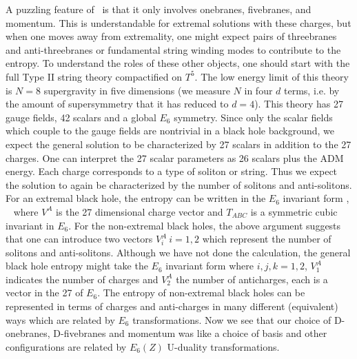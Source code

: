 A puzzling feature of \smira\ is that it only involves onebranes,
fivebranes, and momentum. This is understandable for extremal solutions
with these charges, but when one moves away from extremality, one might
expect pairs of threebranes and anti-threebranes or fundamental string
winding modes to contribute to the entropy. To 
understand the roles
of these other objects, one should start with the full Type II 
string theory
compactified on $T^5$. The  low energy limit of this theory
is $N=8$ supergravity
in five dimensions (we measure $N$ in four $d$ terms,
i.e. by the amount of supersymmetry that it has reduced to $d=4$).
 This theory has 27 gauge fields, 42 scalars and
a global $E_6$ symmetry. Since only the scalar fields which couple to the
gauge fields
 are nontrivial in a black hole background, we expect the general
solution to be characterized by 27 scalars in addition to the 27 charges.
One can interpret the 27 scalar parameters as
 26 scalars
plus the ADM energy. 
 Each charge corresponds to a type of
soliton or string. Thus we expect the solution to again be characterized
by the number of solitons and anti-solitons. For an extremal black hole,
the entropy can be written in the $E_6$ invariant form %
\jpup , \rk\ 
\eqn{}
where $V^A$ is the 27 dimensional charge vector and $T_{ABC}$ is a
symmetric cubic
invariant in $E_6$. For the non-extremal black holes, the above argument
suggests that one
can introduce two vectors $V_i^A \ i=1,2$ which represent the number
of solitons and anti-solitons. Although we have not done the calculation,
the general black hole entropy might take the
$E_6$ invariant form
\eqn{}
where $i,j,k=1,2$, $V^A_1$ indicates the number of charges and 
$V_2^A$ the number of anticharges, each is a vector in the 27 of $E_6$.
The entropy of non-extremal
black holes can be represented in terms of charges and anti-charges
in many different (equivalent) ways which
are related by $E_6$ transformations.
Now we see that our choice of D-onebranes, D-fivebranes and momentum
was like a choice of basis and other configurations are 
related by $E_6(Z)$ U-duality transformations.

